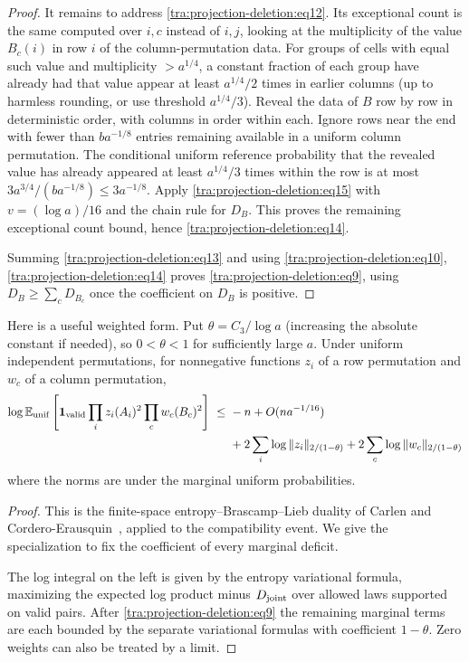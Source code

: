 \begin{proof}
It remains to address \eqref{tra:projection-deletion:eq12}. Its exceptional count is the same computed over \(i,c\) instead of \(i,j\), looking at the multiplicity of the value \(B_c(i)\) in row \(i\) of the column-permutation data. For groups of cells with equal such value and multiplicity \(>a^{1/4}\), a constant fraction of each group have already had that value appear at least \(a^{1/4}/2\) times in earlier columns (up to harmless rounding, or use threshold \(a^{1/4}/3\)). Reveal the data of \(B\) row by row in deterministic order, with columns in order within each. Ignore rows near the end with fewer than \(b a^{-1/8}\) entries remaining available in a uniform column permutation. The conditional uniform reference probability that the revealed value has already appeared at least \(a^{1/4}/3\) times within the row is at most \(3a^{3/4}/(b a^{-1/8})\le 3a^{-1/8}\). Apply \eqref{tra:projection-deletion:eq15} with \(v=(\log a)/16\) and the chain rule for \(D_B\). This proves the remaining exceptional count bound, hence \eqref{tra:projection-deletion:eq14}.

Summing \eqref{tra:projection-deletion:eq13} and using \eqref{tra:projection-deletion:eq10}, \eqref{tra:projection-deletion:eq14} proves \eqref{tra:projection-deletion:eq9}, using \(D_B\ge\sum_c D_{B_c}\) once the coefficient on \(D_B\) is positive.
\end{proof}
\begin{corollary}\label{tra:projection-deletion:weighted}
\label{tra:projection-deletion:weighted-statement}
Here is a useful weighted form. Put \(\theta=C_3/\log a\) (increasing the absolute constant if needed), so \(0<\theta<1\) for sufficiently large \(a\). Under uniform independent permutations, for nonnegative functions \(z_i\) of a row permutation and \(w_c\) of a column permutation,
\begin{equation}
\begin{split}
\log\mathbb E_{\rm unif}\left[\mathbf 1_{\rm valid}
       \prod_i z_i(A_i)^2\prod_c w_c(B_c)^2\right]
\ \le\ &-n+O(n a^{-1/16})\\
 &+2\sum_i\log\|z_i\|_{2/(1-\theta)}
    +2\sum_c\log\|w_c\|_{2/(1-\theta)}
\end{split}
\label{tra:projection-deletion:eq16}
\end{equation}
where the norms are under the marginal uniform probabilities.
\end{corollary}
\begin{proof}\label{tra:projection-deletion:weighted-proof}
\label{tra:projection-deletion:weighted-variational-proof}
This is the finite-space entropy--Brascamp--Lieb duality of Carlen and Cordero-Erausquin~\cite[Theorem~2.1]{CarlenCorderoErausquin2009}, applied to the compatibility event. We give the specialization to fix the coefficient of every marginal deficit.

The log integral on the left is given by the entropy variational formula, maximizing the expected log product minus \(D_{\rm joint}\) over allowed laws supported on valid pairs. After \eqref{tra:projection-deletion:eq9} the remaining marginal terms are each bounded by the separate variational formulas with coefficient \(1-\theta\). Zero weights can also be treated by a limit.
\end{proof}
